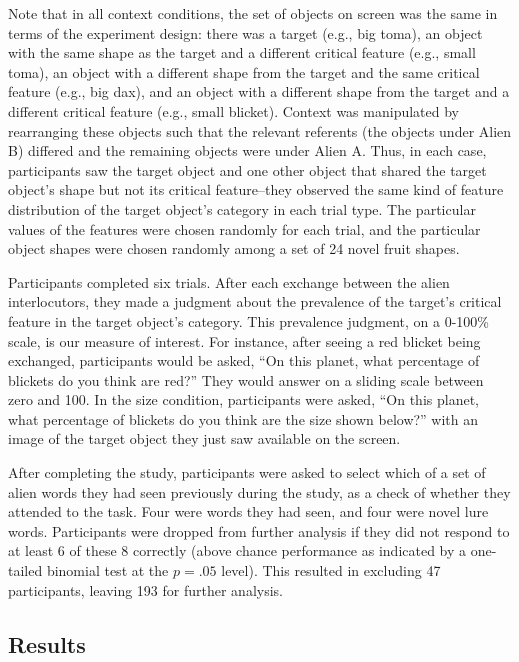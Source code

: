 \documentclass[
  english,
  man,floatsintext]{apa6}
\begin{document}
Note that in all context conditions, the set of objects on screen was the same in terms of the experiment design: there was a target (e.g., big toma), an object with the same shape as the target and a different critical feature (e.g., small toma), an object with a different shape from the target and the same critical feature (e.g., big dax), and an object with a different shape from the target and a different critical feature (e.g., small blicket). Context was manipulated by rearranging these objects such that the relevant referents (the objects under Alien B) differed and the remaining objects were under Alien A. Thus, in each case, participants saw the target object and one other object that shared the target object's shape but not its critical feature--they observed the same kind of feature distribution of the target object's category in each trial type. The particular values of the features were chosen randomly for each trial, and the particular object shapes were chosen randomly among a set of 24 novel fruit shapes.

Participants completed six trials. After each exchange between the alien interlocutors, they made a judgment about the prevalence of the target's critical feature in the target object's category. This prevalence judgment, on a 0-100\% scale, is our measure of interest. For instance, after seeing a red blicket being exchanged, participants would be asked, ``On this planet, what percentage of blickets do you think are red?'' They would answer on a sliding scale between zero and 100. In the size condition, participants were asked, ``On this planet, what percentage of blickets do you think are the size shown below?'' with an image of the target object they just saw available on the screen.

After completing the study, participants were asked to select which of a set of alien words they had seen previously during the study, as a check of whether they attended to the task. Four were words they had seen, and four were novel lure words. Participants were dropped from further analysis if they did not respond to at least 6 of these 8 correctly (above chance performance as indicated by a one-tailed binomial test at the \(p = .05\) level). This resulted in excluding 47 participants, leaving 193 for further analysis.

\hypertarget{results-1}{%
\subsection{Results}\label{results-1}}
\end{document}
